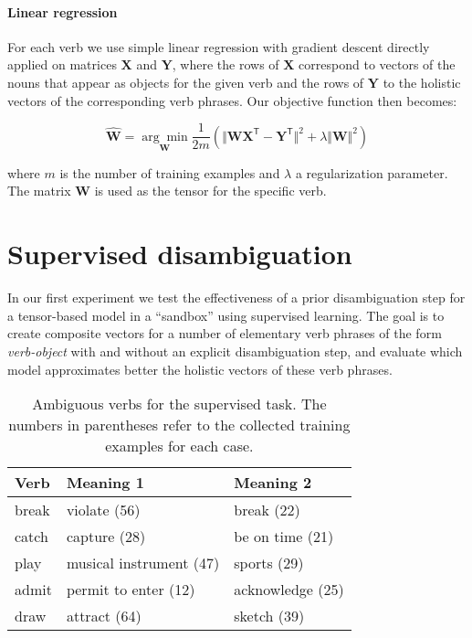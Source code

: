\documentclass[11pt]{article}
\begin{document}
\paragraph{Linear regression} For each verb we use simple linear regression with gradient descent directly applied on matrices $\mathbf{X}$ and $\mathbf{Y}$, where the rows of $\mathbf{X}$ correspond to vectors of the nouns that appear as objects for the given verb and the rows of $\mathbf{Y}$ to the holistic vectors of the corresponding verb phrases. Our objective function then becomes:

\small
\vspace{-0.4cm}
\begin{equation}
 \hat{\mathbf{W}} =  \underset{\mathbf{W}}{\arg\min} \frac{1}{2m} \left( \Vert \mathbf{W} \mathbf{X}^\mathsf{T} - \mathbf{Y}^\mathsf{T} \Vert^2 + \lambda \Vert \mathbf{W} \Vert^2 \right)
\end{equation}
\vspace{-0.4cm}
\normalsize

\noindent where $m$ is the number of training examples and $\lambda$ a regularization parameter. The  matrix $\mathbf{W}$ is used as the tensor for the specific verb.

\section{Supervised disambiguation}
\label{sec:exp1}

In our first experiment we test the effectiveness of a prior disambiguation step for a tensor-based model in a ``sandbox'' using supervised learning. The goal is to create composite vectors for a number of elementary verb phrases of the form \textit{verb-object} with and without an explicit disambiguation step, and evaluate which model approximates better the holistic vectors of these verb phrases. 

\begin{table}[b]
  \small
  \centering
  \begin{tabular}{lll}
   \hline
    \textbf{Verb}  & \textbf{Meaning 1} & \textbf{Meaning 2} \\
   \hline\hline
    break & violate (56) & break (22) \\
    catch & capture (28) & be on time (21) \\
    play  & musical instrument (47) & sports (29) \\
    admit & permit to enter (12) & acknowledge (25) \\
    draw  & attract (64) & sketch (39)  \\
    \hline
  \end{tabular}
  \caption{Ambiguous verbs for the supervised task. The numbers in parentheses refer to the collected training examples for each case.}
  \label{tbl:ambverbs}
  \normalsize
\end{table}
\end{document}
